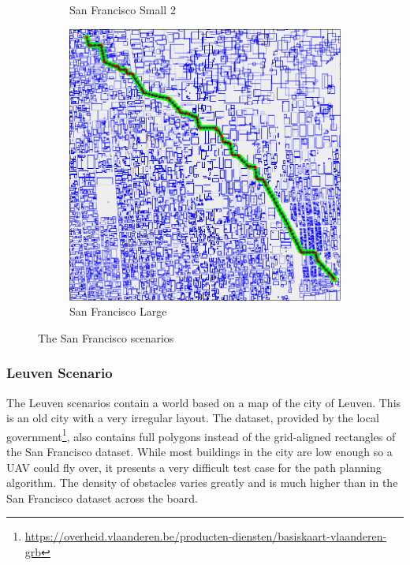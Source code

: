 \begin{figure}
\begin{subfigure}[t]{0.46\textwidth}
        		\caption{San Francisco Small 2}
        		\label{fig:sf-small-2}
	\end{subfigure}	
	\par
	\begin{subfigure}[t]{0.8\textwidth}
        		\includegraphics[width=\textwidth]{img/sf-large}
        		\caption{San Francisco Large}
        		\label{fig:sf-large}
	\end{subfigure}
        
    \caption{The San Francisco scenarios}\label{fig:sf-scens}
\end{figure}

\clearpage
\subsubsection{Leuven Scenario}
\label{subsec:leuven}
The Leuven scenarios contain a world based on a map of the city of Leuven. This is an old city with a very irregular layout. The dataset, provided by the local government\footnote{\url{https://overheid.vlaanderen.be/producten-diensten/basiskaart-vlaanderen-grb}}, also contains full polygons instead of the grid-aligned rectangles of the San Francisco dataset. While most buildings in the city are low enough so a UAV could fly over, it presents a very difficult test case for the path planning algorithm. The density of obstacles varies greatly and is much higher than in the San Francisco dataset across the board.

